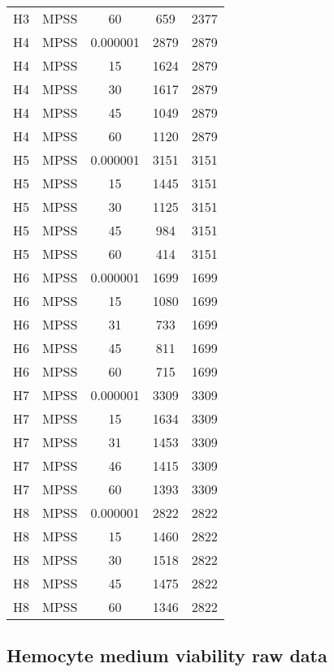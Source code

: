\begin{center}
\begin{longtable}{ccccc}
H3	&	MPSS	&	60	&	659	&	2377	\\
H4	&	MPSS	&	0.000001	&	2879	&	2879	\\
H4	&	MPSS	&	15	&	1624	&	2879	\\
H4	&	MPSS	&	30	&	1617	&	2879	\\
H4	&	MPSS	&	45	&	1049	&	2879	\\
H4	&	MPSS	&	60	&	1120	&	2879	\\
H5	&	MPSS	&	0.000001	&	3151	&	3151	\\
H5	&	MPSS	&	15	&	1445	&	3151	\\
H5	&	MPSS	&	30	&	1125	&	3151	\\
H5	&	MPSS	&	45	&	984	&	3151	\\
H5	&	MPSS	&	60	&	414	&	3151	\\
H6	&	MPSS	&	0.000001	&	1699	&	1699	\\
H6	&	MPSS	&	15	&	1080	&	1699	\\
H6	&	MPSS	&	31	&	733	&	1699	\\
H6	&	MPSS	&	45	&	811	&	1699	\\
H6	&	MPSS	&	60	&	715	&	1699	\\
H7	&	MPSS	&	0.000001	&	3309	&	3309	\\
H7	&	MPSS	&	15	&	1634	&	3309	\\
H7	&	MPSS	&	31	&	1453	&	3309	\\
H7	&	MPSS	&	46	&	1415	&	3309	\\
H7	&	MPSS	&	60	&	1393	&	3309	\\
H8	&	MPSS	&	0.000001	&	2822	&	2822	\\
H8	&	MPSS	&	15	&	1460	&	2822	\\
H8	&	MPSS	&	30	&	1518	&	2822	\\
H8	&	MPSS	&	45	&	1475	&	2822	\\
H8	&	MPSS	&	60	&	1346	&	2822	\\
\end{longtable}    
\end{center}

\pagebreak


\subsection{Hemocyte medium viability raw data}

